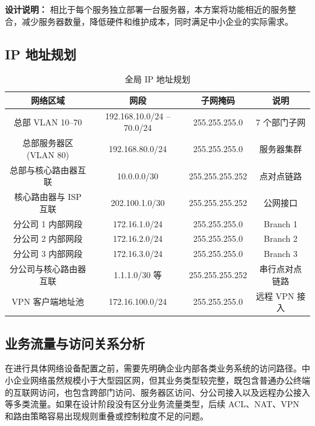 \documentclass[12pt,a4paper]{ctexart}
\begin{document}
\textbf{设计说明：} 相比于每个服务独立部署一台服务器，本方案将功能相近的服务整合，减少服务器数量，降低硬件和维护成本，同时满足中小企业的实际需求。

\subsection{IP 地址规划}

\begin{table}[H]
\centering
\caption{全局 IP 地址规划}
\label{tab:ip}
\begin{tabular}{|c|c|c|c|}
\hline
\textbf{网络区域}        & \textbf{网段}              & \textbf{子网掩码}       & \textbf{说明}          \\ \hline
总部 VLAN 10--70         & 192.168.10.0/24 -- 70.0/24& 255.255.255.0           & 7 个部门子网           \\ \hline
总部服务器区 (VLAN 80)   & 192.168.80.0/24           & 255.255.255.0           & 服务器集群             \\ \hline
总部与核心路由器互联     & 10.0.0.0/30               & 255.255.255.252         & 点对点链路             \\ \hline
核心路由器与 ISP 互联    & 202.100.1.0/30            & 255.255.255.252         & 公网接口               \\ \hline
分公司 1 内部网段        & 172.16.1.0/24             & 255.255.255.0           & Branch 1               \\ \hline
分公司 2 内部网段        & 172.16.2.0/24             & 255.255.255.0           & Branch 2               \\ \hline
分公司 3 内部网段        & 172.16.3.0/24             & 255.255.255.0           & Branch 3               \\ \hline
分公司与核心路由器互联   & 1.1.1.0/30 等             & 255.255.255.252         & 串行点对点链路         \\ \hline
VPN 客户端地址池         & 172.16.100.0/24           & 255.255.255.0           & 远程 VPN 接入          \\ \hline
\end{tabular}
\end{table}

\subsection{业务流量与访问关系分析}

在进行具体网络设备配置之前，需要先明确企业内部各类业务系统的访问路径。中小企业网络虽然规模小于大型园区网，但其业务类型较完整，既包含普通办公终端的互联网访问，也包含跨部门访问、服务器区访问、分公司接入以及远程办公接入等多类流量。如果在设计阶段没有区分业务流量类型，后续 ACL、NAT、VPN 和路由策略容易出现规则重叠或控制粒度不足的问题。
\end{document}
